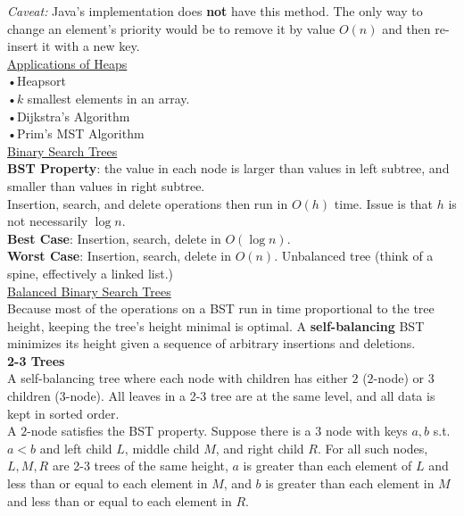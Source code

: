 \documentclass[12pt, fleqn]{general}
\begin{document}
\begin{multicols*}{2}
    \emph{Caveat:} Java's implementation does \textbf{not} have this method. The only way to change an element's priority would be to remove it by value
    $O(n)$ and then re-insert it with a new key.\\

    \underline{Applications of Heaps}\\

    •Heapsort\\
    •$k$ smallest elements in an array.\\
    •Dijkstra's Algorithm\\
    •Prim's MST Algorithm\\

    {\large \underline{Binary Search Trees}}\\

    \textbf{BST Property}: the value in each node is larger than values in left subtree, and smaller than values in right subtree.\\

    Insertion, search, and delete operations then run in $O(h)$ time. Issue is that $h$ is not necessarily $\log n$.\\

    \textbf{Best Case}: Insertion, search, delete in $O(\log n)$.\\

    \textbf{Worst Case}: Insertion, search, delete in $O(n)$. Unbalanced tree (think of a spine, effectively a linked list.)\\

    \underline{Balanced Binary Search Trees}\\

    Because most of the operations on a BST run in time proportional to the tree height, keeping the tree's height minimal is optimal. A \textbf{self-balancing} BST minimizes its height given a sequence of arbitrary insertions and deletions.\\

    \textbf{2-3 Trees}\\

    A self-balancing tree where each node with children has either $2$ ($2$-node) or $3$ children ($3$-node). All leaves in a 2-3 tree are at the same level, and all data is kept in sorted order.\\
    
    A $2$-node satisfies the BST property. Suppose there is a $3$ node with keys $a, b$ s.t. $a < b$ and left child $L$, middle child $M$, and right child $R$. For all such nodes, $L, M, R$ are 2-3 trees of the same height, $a$ is greater than each element of $L$
    and less than or equal to each element in $M$, and $b$ is greater than each element in $M$ and less than or equal to each element in $R$.\\


\end{multicols*}
\end{document}
